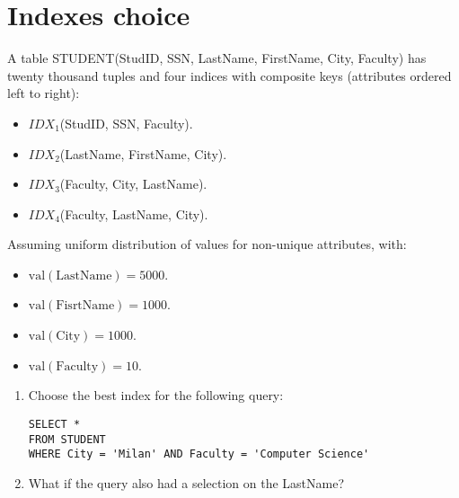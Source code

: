 \section{Indexes choice}

A table STUDENT(StudID, SSN, LastName, FirstName, City, Faculty) has twenty thousand tuples and four indices with composite keys (attributes ordered left to right):
\begin{itemize}
    \item $IDX_1$(StudID, SSN, Faculty).
    \item $IDX_2$(LastName, FirstName, City).
    \item $IDX_3$(Faculty, City, LastName).
    \item $IDX_4$(Faculty, LastName, City).
\end{itemize}
Assuming uniform distribution of values for non-unique attributes, with:
\begin{itemize}
    \item $\text{val}(\text{LastName}) = 5000$.
    \item $\text{val}(\text{FisrtName}) = 1000$.
    \item $\text{val}(\text{City}) = 1000$.
    \item $\text{val}(\text{Faculty}) = 10$.
\end{itemize}
\begin{enumerate}
    \item Choose the best index for the following query:
        \begin{lstlisting}[style=SQL]
SELECT * 
FROM STUDENT
WHERE City = 'Milan' AND Faculty = 'Computer Science'
        \end{lstlisting}
    \item What if the query also had a selection on the LastName?
\end{enumerate}

